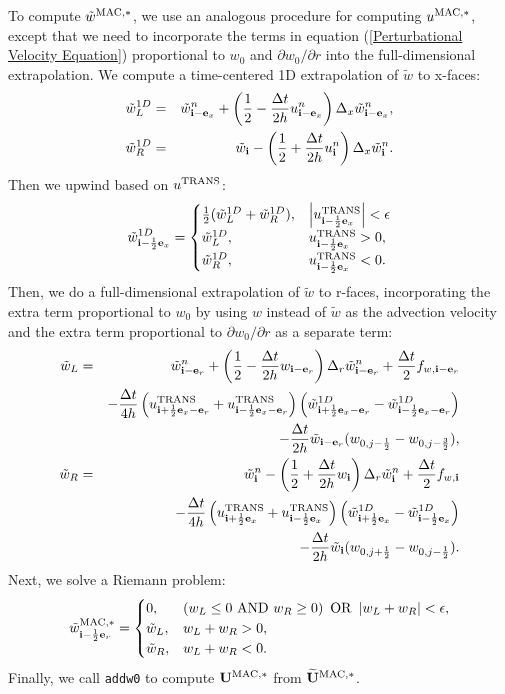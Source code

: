\documentclass[11pt]{article}
\def\half  {\frac{1}{2}}
\def\dt    {\Delta t}
\def\mac   {\rm MAC}
\def\trans {\rm TRANS}
\def\eb    {{\bf e}}
\def\ib    {{\bf i}}
\def\Ub    {{\bf U}}
\def\Ubt   {\widetilde{\bf U}}
\def\wt    {\tilde{w}}
\begin{document}
To compute $\wt^{\mac,*}$, we use an analogous procedure for computing $u^{\mac,*}$, except that we need to incorporate the terms in equation (\ref{Perturbational Velocity Equation}) proportional to $w_0$ and $\partial w_0/\partial r$ into the full-dimensional extrapolation.  We compute a time-centered 1D extrapolation of $\wt$ to x-faces:
\begin{eqnarray}
\wt_L^{1D} &=& \wt_{\ib-\eb_x}^n + \left(\half - \frac{\dt}{2h}u_{\ib-\eb_x}^n\right)\Delta_x \wt_{\ib-\eb_x}^n, \\
\wt_R^{1D} &=& \wt_{\ib} - \left(\half + \frac{\dt}{2h}u_{\ib}^n\right)\Delta_x \wt_{\ib}^n.
\end{eqnarray}
Then we upwind based on $u^{\trans}$:
\begin{equation}
\wt_{\ib-\half\eb_x}^{1D} =
\begin{cases}
\half(\wt_L^{1D} + \wt_R^{1D}), & \left|u^{\trans}_{\ib-\half\eb_x}\right| < \epsilon \\
\wt_L^{1D}, & u^{\trans}_{\ib-\half\eb_x} > 0, \\
\wt_R^{1D}, & u^{\trans}_{\ib-\half\eb_x} < 0. \\
\end{cases}
\end{equation}
Then, we do a full-dimensional extrapolation of $\wt$ to r-faces, incorporating the extra term proportional to $w_0$ by using $w$ instead of $\wt$ as the advection velocity and the extra term proportional to $\partial w_0/\partial r$ as a separate term:
\begin{eqnarray}
\wt_L &=& \wt_{\ib-\eb_r}^n + \left(\half - \frac{\dt}{2h}w_{\ib-\eb_r}\right)\Delta_r \wt_{\ib-\eb_r}^n + \frac{\dt}{2}f_{w,\ib-\eb_r} \nonumber \\
&& - \frac{\dt}{4h}\left(u_{\ib+\half\eb_x-\eb_r}^{\trans}+u_{\ib-\half\eb_x-\eb_r}^{\trans}\right)\left(\wt_{\ib+\half\eb_x-\eb_r}^{1D} - \wt_{\ib-\half\eb_x-\eb_r}^{1D}\right) \nonumber \\
&& - \frac{\dt}{2h}\wt_{\ib-\eb_r}(w_{0,j-\half} - w_{0,j-\frac{3}{2}}),\label{wt_L Extrapolation} \\
\wt_R &=& \wt_{\ib}^n - \left(\half + \frac{\dt}{2h}w_{\ib}\right)\Delta_r \wt_{\ib}^n + \frac{\dt}{2}f_{w,\ib} \nonumber \\
&& - \frac{\dt}{4h}\left(u_{\ib+\half\eb_x}^{\trans}+u_{\ib-\half\eb_x}^{\trans}\right)\left(\wt_{\ib+\half\eb_x}^{1D} - \wt_{\ib-\half\eb_x}^{1D}\right) \nonumber \\
&& - \frac{\dt}{2h}\wt_{\ib}(w_{0,j+\half} - w_{0,j-\half}).\label{wt_R Extrapolation}
\end{eqnarray}
Next, we solve a Riemann problem:
\begin{equation}
\wt_{\ib-\half\eb_r}^{\mac,*} =
\begin{cases}
0, & \left(w_L \le 0 ~ {\rm AND} ~ w_R \ge 0\right) ~ {\rm OR} ~ \left|w_L + w_R\right| < \epsilon, \\
\wt_L, & w_L + w_R > 0, \\
\wt_R, & w_L + w_R < 0. 
\end{cases}
\end{equation}
Finally, we call {\tt addw0} to compute $\Ub^{\mac,*}$ from $\Ubt^{\mac,*}$.
\end{document}
